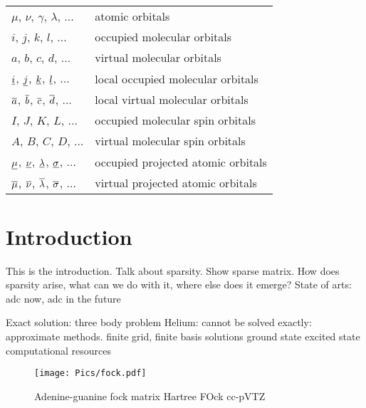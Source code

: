 \documentclass[a4paper,12pt]{report}
\begin{document}
\begin{table}[h]
\setlength{\tabcolsep}{14pt}
\renewcommand{\arraystretch}{1.5}
\begin{tabular}{ll}
$\mu$, $\nu$, $\gamma$, $\lambda$, ... & atomic orbitals \\
$i$, $j$, $k$, $l$, ... & occupied molecular orbitals \\
$a$, $b$, $c$, $d$, ... & virtual molecular orbitals \\
$\underline{i}$, $\underline{j}$, $\underline{k}$, $\underline{l}$, ... & local occupied molecular orbitals \\
$\overline{a}$, $\overline{b}$, $\overline{c}$, $\overline{d}$, ... & local virtual molecular orbitals \\
$I$, $J$, $K$, $L$, ... & occupied molecular spin orbitals \\
$A$, $B$, $C$, $D$, ... & virtual molecular spin orbitals \\
$\underline{\mu}$, $\underline{\nu}$, $\underline{\lambda}$, $\underline{\sigma}$, ... & occupied projected atomic orbitals \\
$\overline{\mu}$, $\overline{\nu}$, $\overline{\lambda}$, $\overline{\sigma}$, ... & virtual projected atomic orbitals
\end{tabular}
\end{table}




\newpage

\setcounter{tocdepth}{2}
\tableofcontents

\newpage

\listoffigures

\newpage

\listoftables

\newpage


\chapter*{Introduction}

This is the introduction. Talk about sparsity. Show sparse matrix. How does sparsity arise, what can we do with it, where else does it emerge?
State of arts: adc now, adc in the future

Exact solution: three body problem
Helium: cannot be solved exactly: approximate methods. finite grid, finite basis
solutions
ground state excited state
computational resources

\begin{figure}
\centering
\texttt{[image: Pics/fock.pdf]}
\caption{Adenine-guanine fock matrix Hartree FOck cc-pVTZ}
\label{SparseExample}
\end{figure}
\end{document}
